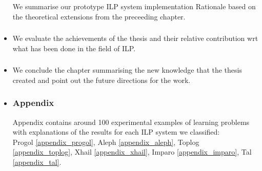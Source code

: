 \begin{itemize}
We summarise our prototype ILP system implementation Rationale based on the theoretical extensions from the preceeding chapter.
\item \subsubsection{}
We evaluate the achievements of the thesis and their relative contribution wrt what has been done in the field of ILP.
\item \subsubsection{}
We conclude the chapter summarising the new knowledge that the thesis created and point out the future directions for the work.
\item \subsubsection{Appendix}
Appendix contains around 100 experimental examples of learning problems with explanations of the results for each ILP system we classified:\\
Progol \ref{appendix_progol},
Aleph \ref{appendix_aleph},
Toplog \ref{appendix_toplog},  
Xhail \ref{appendix_xhail},
Imparo \ref{appendix_imparo},
Tal \ref{appendix_tal}.
\end{itemize}